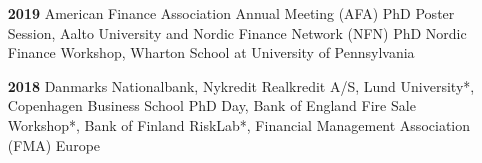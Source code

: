 \documentclass[11pt]{res} %
\begin{document}
\begin{resume}
\begin{itemize}
\item[\textbf{2019}]  American Finance Association Annual Meeting (AFA) PhD Poster Session, Aalto University and Nordic Finance Network (NFN) PhD Nordic Finance Workshop, Wharton School at University of Pennsylvania\\[-1ex]

\item[\textbf{2018}]  Danmarks Nationalbank, Nykredit Realkredit A/S, Lund University*, Copenhagen Business School PhD Day, Bank of England Fire Sale Workshop*, Bank of Finland RiskLab*, Financial Management Association (FMA) Europe\\[-1ex]
\end{itemize}


 

 







\end{resume}
\end{document}
